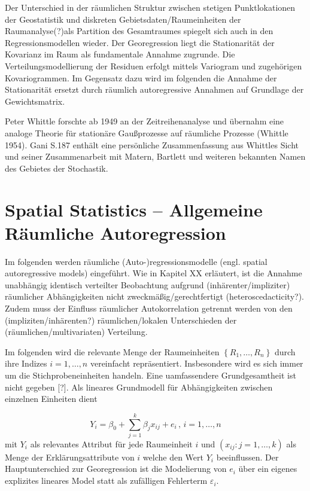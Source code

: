 Der Unterschied in der räumlichen Struktur zwischen stetigen Punktlokationen der Geostatistik und 
diskreten Gebietsdaten/Raumeinheiten der Raumanalyse(?)als Partition des Gesamtraumes spiegelt sich auch in den Regressionsmodellen wieder. 
Der Georegression liegt die Stationarität der Kovarianz im Raum als fundamentale Annahme zugrunde. 
Die Verteilungsmodellierung der Residuen erfolgt mittels Variogram und zugehörigen Kovariogrammen.
Im Gegensatz dazu wird im folgenden die Annahme der Stationarität ersetzt durch 
räumlich autoregressive Annahmen auf Grundlage der Gewichtsmatrix. 

Peter Whittle forschte ab 1949 an der Zeitreihenanalyse und übernahm eine analoge 
Theorie für stationäre Gaußprozesse auf räumliche Prozesse (Whittle 1954). Gani S.187 enthält eine 
persönliche Zusammenfassung aus Whittles Sicht und seiner Zusammenarbeit mit Matern, Bartlett und weiteren bekannten
Namen des Gebietes der Stochastik. 

\section{Spatial Statistics – Allgemeine Räumliche Autoregression}

Im folgenden werden räumliche (Auto-)regressionsmodelle (engl. spatial autoregressive models) eingeführt. 
Wie in Kapitel XX erläutert, ist die Annahme unabhängig identisch verteilter Beobachtung aufgrund 
(inhärenter/impliziter) räumlicher Abhängigkeiten nicht zweckmäßig/gerechtfertigt (heteroscedacticity?). 
Zudem muss der Einfluss räumlicher Autokorrelation getrennt werden von den (impliziten/inhärenten?) 
räumlichen/lokalen Unterschieden der (räumlichen/multivariaten) Verteilung.

Im folgenden wird die relevante Menge der Raumeinheiten $\left\{ R_1,\ldots,R_n \right\}$ durch ihre 
Indizes $i=1,\ldots,n$ vereinfacht repräsentiert. Insbesondere wird es sich immer um 
die Stichprobeneinheiten handeln. Eine uamfassendere Grundgesamtheit ist nicht gegeben [?].
Als lineares Grundmodell für Abhängigkeiten zwischen einzelnen Einheiten dient

\begin{equation} \label{eq-6.1:reg-mod-gen}
    Y_{i}=\beta_{0}+\sum_{j=1}^{k} \beta_{j} x_{ij} +e_{i} \, , \, i=1,\ldots,n
\end{equation}
mit $Y_i$ als relevantes Attribut für jede Raumeinheit $i$ und $(x_{ij}:j=1,\ldots ,k)$ als Menge der
Erklärungsattribute von $i$ welche den Wert $Y_{i}$ beeinflussen. Der Hauptunterschied zur Georegression ist
die Modelierung von $e_{i}$ über ein eigenes explizites lineares Model statt als zufälligen Fehlerterm $\varepsilon_{i}$.

